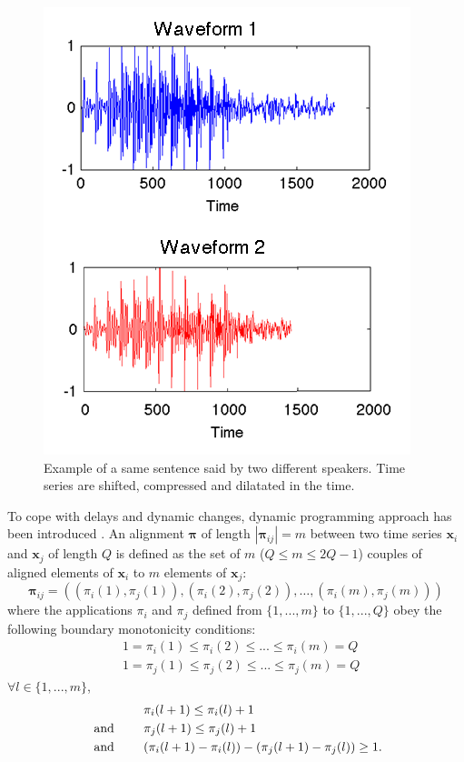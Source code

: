 \begin{figure}[h!]
\centering
\includegraphics[width=0.5\linewidth]{images/Voice_Example2}
\caption{Example of a same sentence said by two different speakers. Time series are shifted, compressed and dilatated in the time.}
\label{fig:Voice_Example}
\end{figure}
To cope with delays and dynamic changes, dynamic programming approach has been introduced \cite{Berndt1994a}. An alignment $\boldsymbol{\pi}$ of length $|\boldsymbol{\pi}_{ij}|=m$ between two time series $\textbf{x}_i$ and $\textbf{x}_j$ of length $Q$ is defined as the set of $m$ ($Q \leq m \leq 2Q-1$) couples of aligned elements of $\textbf{x}_i$ to $m$ elements of $\textbf{x}_j$:
\begin{equation}
\boldsymbol{\pi}_{ij} = 
\left(  
(\pi_i(1),\pi_j(1)), 
(\pi_i(2),\pi_j(2)), 
\ldots,
(\pi_i(m),\pi_j(m))
\right) 
\end{equation}
\noindent where the applications $\pi_i$ and $\pi_j$ defined from $\{1, ..., m\}$ to $\{1, ..., Q\}$ obey the following boundary monotonicity conditions: 
\begin{align}
& 1 = \pi_i(1) \leq \pi_i(2) \leq ... \leq \pi_i(m) = Q \\
& 1 = \pi_j(1) \leq \pi_j(2) \leq ... \leq \pi_j(m) = Q 
\end{align}
$\forall l \in \{1, ..., m\}$, 
\begin{align}
& \pi_i(l+1) \leq \pi_i(l)+1 \\
\text{  and  \qquad} & \pi_j(l+1) \leq \pi_j(l)+1 \\
\text{  and  \qquad} & ( \pi_i(l+1)-\pi_i(l) ) - ( \pi_j(l+1)-\pi_j(l)) \geq 1 . 
\end{align}
